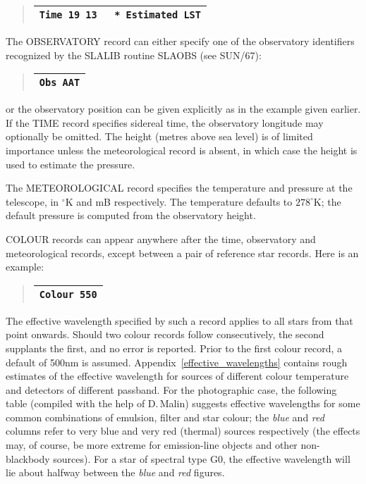 \documentclass[twoside,11pt]{article}
\newcommand{\xref}[3]{#1}
\renewcommand{\_}{\texttt{\symbol{95}}}
\begin{document}
\begin{quote}
\begin{tabular}{|l|}
\hline
\verb|Time 19 13   * Estimated LST| \\
\hline
\end{tabular}
\end{quote}

The OBSERVATORY record can either specify one of the observatory
identifiers recognized by the \xref{SLALIB}{sun67}{} routine
\xref{SLA\_OBS}{sun67}{SLA_OBS} (see SUN/67):

\begin{quote}
\begin{tabular}{|l|}
\hline
\verb|Obs AAT| \\
\hline
\end{tabular}
\end{quote}

or the observatory position can be given explicitly as in the example
given earlier.  If the TIME record specifies sidereal time, the
observatory longitude may optionally be omitted.  The height (metres above
sea level) is of limited importance unless the meteorological record is
absent, in which case the height is used to estimate the pressure.

The METEOROLOGICAL record specifies the temperature and pressure at the
telescope, in $^\circ$K and mB respectively.  The temperature defaults
to $278^\circ$K; the default pressure is computed from the observatory
height.

COLOUR records can appear anywhere after the time, observatory and
meteorological records, except between a pair of reference star records.
Here is an example:

\begin{quote}
\begin{tabular}{|l|}
\hline
\verb|Colour 550| \\
\hline
\end{tabular}
\end{quote}

The effective wavelength specified by such a record applies to all
stars from that point onwards.  Should two colour records follow
consecutively, the second supplants the first, and no error is reported.
Prior to the first colour record, a default of 500nm is assumed.
Appendix~\ref{effective_wavelengths} contains rough estimates of the
effective wavelength for sources of different colour temperature and
detectors of different passband.  For the photographic case, the following
table (compiled with the help of D.\,Malin) suggests effective wavelengths
for some common combinations of emulsion, filter and star colour;
the \textit{blue} and \textit{red} columns refer to very blue and
very red (thermal) sources respectively (the effects may, of course, be
more extreme for emission-line objects and other non-blackbody sources).
For a star of spectral type G0, the effective wavelength will lie about
halfway between the \textit{blue} and \textit{red} figures.
\end{document}
